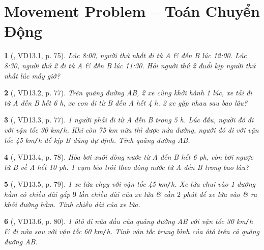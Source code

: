 \documentclass{article}
\newtheorem{baitoan}{}
\begin{document}

\section{Movement Problem -- Toán Chuyển Động}

\begin{baitoan}[\cite{TLCT_THCS_Toan_6_so_hoc}, VD13.1, p. 75]
	Lúc {\rm8:00}, người thứ nhất đi từ A \& đến B lúc {\rm12:00}. Lúc {\rm8:30}, người thứ 2 đi từ A \& đến B lúc {\rm11:30}. Hỏi người thứ 2 đuổi kịp người thứ nhất lúc mấy giờ?
\end{baitoan}

\begin{baitoan}[\cite{TLCT_THCS_Toan_6_so_hoc}, VD13.2, p. 77]
	Trên quãng đường AB, 2 xe cùng khởi hành 1 lúc, xe tải đi từ A đến B hết {\rm6 h}, xe con đi từ B đến A hết {\rm4 h}. 2 xe gặp nhau sau bao lâu?
\end{baitoan}

\begin{baitoan}[\cite{TLCT_THCS_Toan_6_so_hoc}, VD13.3, p. 77]
	1 người phải đi từ A đến B trong {\rm5 h}. Lúc đầu, người đó đi với vận tốc {\rm30 km{\tt/}h}. Khi còn {\rm75 km} nữa thì được nửa đường, người đó đi với vận tốc {\rm45 km{\tt/}h} để kịp B đúng dự định. Tính quãng đường AB.
\end{baitoan}

\begin{baitoan}[\cite{TLCT_THCS_Toan_6_so_hoc}, VD13.4, p. 78]
	Hòa bơi xuôi dòng nước từ A đến B hết {\rm6 ph}, còn bơi ngược từ B về A hết {\rm10 ph}. 1 cụm bèo trôi theo dòng nước từ A đến B trong bao lâu?
\end{baitoan}

\begin{baitoan}[\cite{TLCT_THCS_Toan_6_so_hoc}, VD13.5, p. 79]
	1 xe lửa chạy với vận tốc {\rm45 km{\tt/}h}. Xe lửa chui vào 1 đường hầm có chiều dài gấp $9$ lần chiều dài của xe lửa \& cần $2$ phút để xe lửa vào \& ra khỏi đường hầm. Tính chiều dài của xe lửa.
\end{baitoan}

\begin{baitoan}[\cite{TLCT_THCS_Toan_6_so_hoc}, VD13.6, p. 80]
	1 ôtô đi nửa đầu của quãng đường AB với vận tốc {\rm30 km{\tt/}h} \& đi nửa sau với vận tốc {\rm60 km{\tt/}h}. Tính vận tốc trung bình của ôtô trên cả quãng đường AB.
\end{baitoan}
\end{document}
